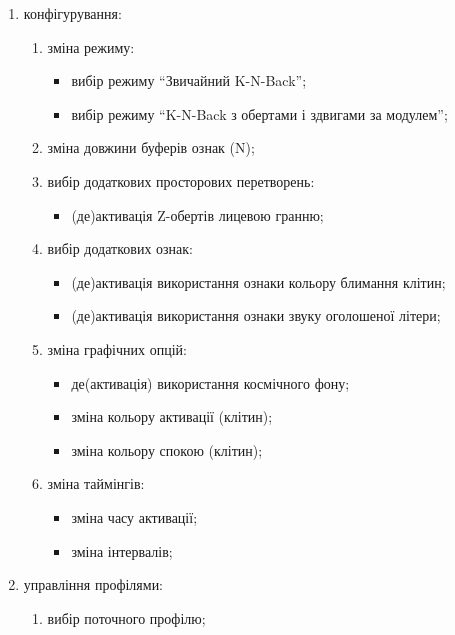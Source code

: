 \begin{enumerate}
  \item конфігурування:
    \begin{enumerate}[leftmargin=24pt]
      \item зміна режиму:
        \begin{itemize}[leftmargin=24pt]
          \item вибір режиму ``Звичайний K-N-Back'';
          \item вибір режиму ``K-N-Back з обертами і здвигами за модулем'';
        \end{itemize}
      \item зміна довжини буферів ознак (N);
      \item вибір додаткових просторових перетворень:
        \begin{itemize}[leftmargin=24pt]
          \item (де)активація Z-обертів лицевою гранню;
        \end{itemize}
      \item вибір додаткових ознак:
        \begin{itemize}[leftmargin=24pt]
          \item (де)активація використання ознаки кольору блимання клітин;
          \item (де)активація використання ознаки звуку оголошеної літери;
        \end{itemize}
      \item зміна графічних опцій:
        \begin{itemize}[leftmargin=24pt]
          \item де(активація) використання космічного фону;
          \item зміна кольору активації (клітин);
          \item зміна кольору спокою (клітин);
        \end{itemize}
      \item зміна таймінгів:
        \begin{itemize}[leftmargin=24pt]
          \item зміна часу активації;
          \item зміна інтервалів;
        \end{itemize}
    \end{enumerate}
  \item управління профілями:
    \begin{enumerate}[leftmargin=24pt]
      \item вибір поточного профілю;

\end{enumerate}
\end{enumerate}
